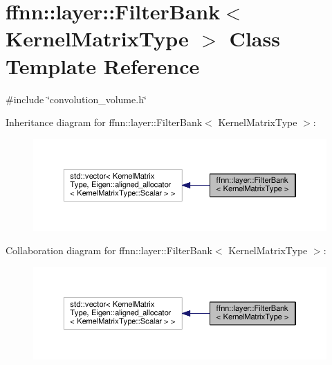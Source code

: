 \hypertarget{classffnn_1_1layer_1_1_filter_bank}{\section{ffnn\-:\-:layer\-:\-:Filter\-Bank$<$ Kernel\-Matrix\-Type $>$ Class Template Reference}
\label{classffnn_1_1layer_1_1_filter_bank}
}


{\ttfamily \#include \char`\"{}convolution\-\_\-volume.\-h\char`\"{}}



Inheritance diagram for ffnn\-:\-:layer\-:\-:Filter\-Bank$<$ Kernel\-Matrix\-Type $>$\-:
\nopagebreak
\begin{figure}[H]
\begin{center}
\leavevmode
\includegraphics[width=350pt]{classffnn_1_1layer_1_1_filter_bank__inherit__graph}
\end{center}
\end{figure}


Collaboration diagram for ffnn\-:\-:layer\-:\-:Filter\-Bank$<$ Kernel\-Matrix\-Type $>$\-:
\nopagebreak
\begin{figure}[H]
\begin{center}
\leavevmode
\includegraphics[width=350pt]{classffnn_1_1layer_1_1_filter_bank__coll__graph}
\end{center}
\end{figure}
